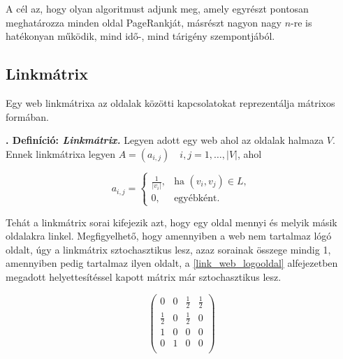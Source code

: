 \documentclass[12pt,a4paper]{article}
\newcounter{definicioszam}
\newenvironment{definicio}[1]
{{\medskip}\noindent \stepcounter{definicioszam}
{\bfseries{\thedefinicioszam. Definíció: \textit{#1.}}}}{\bigskip }
\begin{document}
A cél az, hogy olyan algoritmust adjunk meg, amely egyrészt pontosan meghatározza minden oldal PageRankját, másrészt nagyon nagy $n$-re is hatékonyan működik, mind idő-, mind tárigény szempontjából. 

\subsection{Linkmátrix}\label{linkmatrix}

Egy web linkmátrixa az oldalak közötti kapcsolatokat reprezentálja mátrixos formában.

\begin{definicio}{Linkmátrix}
	Legyen adott egy web ahol az oldalak halmaza $V$. Ennek linkmátrixa legyen $A = (a_{i,j}) \quad i,j = 1,\ldots,|V| $, ahol
	
	\begin{equation*}
	a_{i,j}=\begin{cases}
	\frac{1}{ |v_i| }, & \text{ha $(v_i,v_j) \in L$},\\
	0, & \text{egyébként}.
	\end{cases}
	\end{equation*}
	
\end{definicio}

Tehát a linkmátrix sorai kifejezik azt, hogy egy oldal mennyi és melyik másik oldalakra linkel. Megfigyelhető, hogy amennyiben a web nem tartalmaz lógó oldalt, úgy a linkmátrix sztochasztikus lesz, azaz sorainak összege mindig 1, amennyiben pedig tartalmaz ilyen oldalt, a \ref{link_web_logooldal} alfejezetben megadott helyettesítéssel kapott mátrix már sztochasztikus lesz. 

\bigskip
\begin{minipage}{0.4\textwidth}
	\begin{center}
	\end{center}
\end{minipage}
\begin{minipage}{0.5\textwidth}
	\begin{center}
		\[
		\begin{pmatrix}
		0 & 0 & \frac{1}{2} & \frac{1}{2} \\  
		\frac{1}{2} & 0 & \frac{1}{2} & 0 \\
		1 & 0 & 0 & 0 \\
		0 & 1 & 0 & 0 \\
		\end{pmatrix}
		\]
	\end{center}
\end{minipage}
\end{document}

